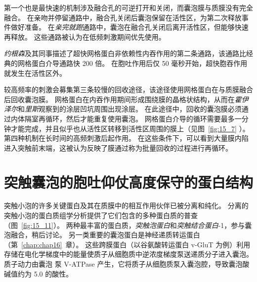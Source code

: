 第一个也是最快速的机制涉及融合孔的可逆打开和关闭，而囊泡膜与质膜没有完全融合。
在亲吻并停留通路中，融合孔关闭后囊泡保留在活性区，为第二次释放事件做好准备。
在\textit{亲完就跑}通路中，囊泡在融合孔关闭后离开活性区，但能够快速再释放。
这些通路被认为在低频刺激期间优先使用。


\textit{约根森}及其同事描述了超快网格蛋白非依赖性内吞作用的第二条通路，该通路比经典的网格蛋白介导通路快 200 倍。
在胞吐作用后仅 50 毫秒开始，超快胞吞作用就发生在活性区外。


较高频率的刺激会募集第三条较慢的回收途径，该途径使用网格蛋白在与质膜融合后回收囊泡膜。
网格蛋白在内吞作用期间形成围绕膜的晶格状结构，从而在\textit{霍伊泽尔}和\textit{里斯}观察到的涂层凹坑周围出现涂层。
在此途径中，回收的囊泡膜必须通过内体隔室再循环，然后才能重复使用囊泡。
网格蛋白介导的循环需要最多一分钟才能完成，并且似乎也从活性区转移到活性区周围的膜上（见图~\ref{fig:15_7} ）。
第四种机制在长时间的高频刺激后起作用。
在这些条件下，可以看到大量膜内陷进入突触前末端，这被认为反映了膜通过称为批量回收的过程进行再循环。



\section{突触囊泡的胞吐仰仗高度保守的蛋白结构}

突触小泡的许多关键蛋白及其在质膜中的相互作用伙伴已被分离和纯化。
分离的突触小泡的蛋白质组学分析提供了它们包含的多种蛋白质的普查（图~\ref{fig:15_11}）。
两种最丰富的蛋白质，\textit{突触泡蛋白}和\textit{突触结合蛋白}-1，参与囊泡融合，稍后讨论。
另一类重要的囊泡蛋白是神经递质转运蛋白（第~\ref{chap:chap16}~章）。
这些跨膜蛋白（以谷氨酸转运蛋白 v-GluT 为例）利用存储在电化学梯度中的能量使质子从细胞质中逆浓度梯度泵送递质分子进入囊泡。
质子动力由囊泡  泵 V-ATPase 产生，它将质子从细胞质泵入囊泡腔，导致囊泡酸碱值约为 5.0 的酸性。


